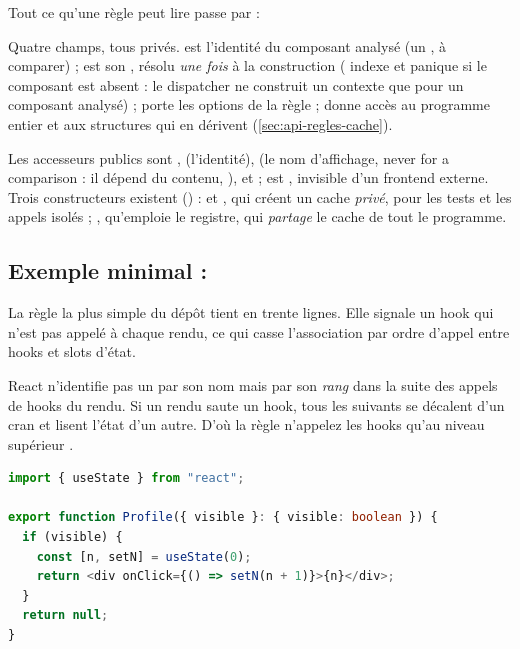 Tout ce qu'une règle peut lire passe par  :


Quatre champs, tous privés.  est l'identité du composant analysé (un , à comparer) ;  est son , résolu \emph{une fois} à la construction ( indexe  et panique si le composant est absent : le dispatcher ne construit un contexte que pour un composant analysé) ;  porte les options de la règle ;  donne accès au programme entier et aux structures qui en dérivent (\cref{sec:api-regles-cache}).

Les accesseurs publics sont ,  (l'identité),  (le nom d'affichage, \og never for a comparison\fg{} : il dépend du contenu, ),  et  ;  est , invisible d'un frontend externe. Trois constructeurs existent () :  et , qui créent un cache \emph{privé}, pour les tests et les appels isolés ; , qu'emploie le registre, qui \emph{partage} le cache de tout le programme.

\subsection{Exemple minimal : }

La règle la plus simple du dépôt tient en trente lignes. Elle signale un hook qui n'est pas appelé à chaque rendu, ce qui casse l'association par ordre d'appel entre hooks et slots d'état.

\begin{react}
React n'identifie pas un  par son nom mais par son \emph{rang} dans la suite des appels de hooks du rendu. Si un rendu saute un hook, tous les suivants se décalent d'un cran et lisent l'état d'un autre. D'où la règle \og n'appelez les hooks qu'au niveau supérieur\fg{} \cite{ReactRulesOfHooks}.
\end{react}

\begin{lstlisting}[language=TypeScript,caption={Un hook sous condition (\file{/tmp/ch17/profile.tsx})},label={lst:api-regles-profile}]
import { useState } from "react";

export function Profile({ visible }: { visible: boolean }) {
  if (visible) {
    const [n, setN] = useState(0);
    return <div onClick={() => setN(n + 1)}>{n}</div>;
  }
  return null;
}
\end{lstlisting}

